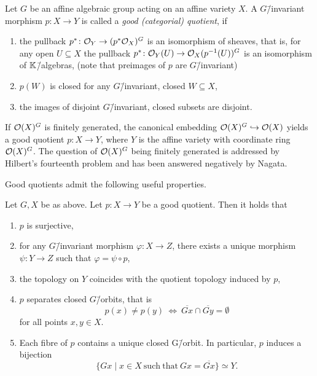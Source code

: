 \begin{defi}
	Let $G$ be an affine algebraic group acting on an affine variety $X$. A $G$\=/invariant morphism $p\colon X \rightarrow Y$ is called a \emph{good (categorial) quotient}, if
	\begin{enumerate}[label={\upshape(\roman*)}]
		\item the pullback $p^*\colon \mathcal{O}_Y \rightarrow (p^*\mathcal{O}_X)^G$ is an isomorphism of sheaves, that is, for any open $U\subseteq X$ the pullback $p^*\colon \mathcal{O}_Y(U) \rightarrow \mathcal{O}_X(p^{-1}(U))^G$ is an isomorphism of $\mathbb{K}$\=/algebras, (note that preimages of $p$ are $G$\=/invariant)
		\item $p(W)$ is closed for any $G$\=/invariant, closed $W\subseteq X$,
		\item the images of disjoint $G$\=/invariant, closed subsets are disjoint.
	\end{enumerate}
\end{defi}

If $\mathcal{O}(X)^G$ is finitely generated, the canonical embedding $\mathcal{O}(X)^G \hookrightarrow \mathcal{O}(X)$ yields a good quotient $p\colon X \rightarrow Y$, where $Y$ is the affine variety with coordinate ring $\mathcal{O}(X)^G$. The question of $\mathcal{O}(X)^G$ being finitely generated is addressed by Hilbert's fourteenth problem and has been answered negatively by Nagata. \cite[chapter 4]{lectures_invariant_theory}

Good quotients admit the following useful properties.

\begin{prop}
	\label{prop:good_quotient_properties}
	Let $G, X$ be as above. Let $p\colon X \rightarrow Y$ be a good quotient. Then it holds that
	\begin{enumerate}[label={\upshape(\roman*)}]
		\item $p$ is surjective,
		\item for any $G$\=/invariant morphism $\varphi\colon X \rightarrow Z$, there exists a unique morphism $\psi\colon Y \rightarrow Z$ such that $\varphi = \psi \circ p$,
		\label{enum_item:good_quotient_universal_property}
		\item the topology on $Y$ coincides with the quotient topology induced by $p$,
		\item $p$ separates closed $G$\=/orbits, that is
		$$p(x) \neq p(y)\ \Leftrightarrow\ \overline{Gx}\cap\overline{Gy} = \emptyset$$
		for all points $x,y\in X$.
		\item Each fibre of $p$ contains a unique closed G\=/orbit. In particular, $p$ induces a bijection
		$$\{Gx\mid x\in X\ \mathrm{such}\ \mathrm{that}\ Gx = \overline{Gx}\}\simeq Y.$$
		\label{enum_item:good_quotient_space_bijection_closed_orbits}
	\end{enumerate}
\end{prop}

